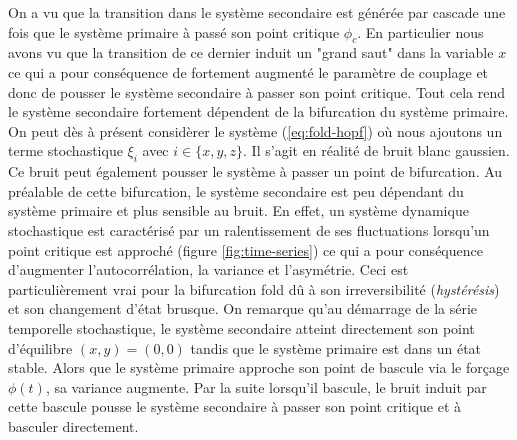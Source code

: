 On a vu que la transition dans le système secondaire est générée par cascade une fois que le système primaire à passé son point critique $\phi_c$. En particulier nous avons vu que la transition de ce dernier induit un "grand saut" dans la variable $x$ ce qui a pour conséquence de fortement augmenté le paramètre de couplage et donc de pousser le système secondaire à passer son point critique. Tout cela rend le système secondaire fortement dépendent de la bifurcation du système primaire.
On peut dès à présent considèrer le système (\ref{eq:fold-hopf}) où nous ajoutons un terme stochastique $\xi_i$ avec $i \in \{x, y, z\}$. Il s'agit en réalité de bruit blanc gaussien. Ce bruit peut également pousser le système à passer un point de bifurcation.
Au préalable de cette bifurcation, le système secondaire est peu dépendant du système primaire et plus sensible au bruit. En effet, un système dynamique stochastique est caractérisé par un ralentissement de ses fluctuations lorsqu'un point critique est approché (figure \ref{fig:time-series}) ce qui a pour conséquence d'augmenter l'autocorrélation, la variance et l'asymétrie. Ceci est particulièrement vrai pour la bifurcation fold dû à son irreversibilité (\emph{hystérésis}) et son changement d'état brusque. On remarque qu'au démarrage de la série temporelle stochastique, le système secondaire atteint directement son point d'équilibre $(x,y) = (0,0)$ tandis que le système primaire est dans un état stable. Alors que le système primaire approche son point de bascule via le forçage $\phi(t)$, sa variance augmente. Par la suite lorsqu'il bascule, le bruit induit par cette bascule pousse le système secondaire à passer son point critique et à basculer directement.

